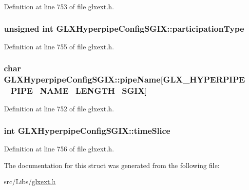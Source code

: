 Definition at line 753 of file glxext.h.

\hypertarget{struct_g_l_x_hyperpipe_config_s_g_i_x_a093cfaaec305531f66e1120929b5b01b}{
\subsubsection[{participationType}]{\setlength{\rightskip}{0pt plus 5cm}unsigned int {\bf GLXHyperpipeConfigSGIX::participationType}}}
\label{struct_g_l_x_hyperpipe_config_s_g_i_x_a093cfaaec305531f66e1120929b5b01b}


Definition at line 755 of file glxext.h.

\hypertarget{struct_g_l_x_hyperpipe_config_s_g_i_x_a9e3748f92005cac81cb44d4c67acccb8}{
\subsubsection[{pipeName}]{\setlength{\rightskip}{0pt plus 5cm}char {\bf GLXHyperpipeConfigSGIX::pipeName}\mbox{[}GLX\_\-HYPERPIPE\_\-PIPE\_\-NAME\_\-LENGTH\_\-SGIX\mbox{]}}}
\label{struct_g_l_x_hyperpipe_config_s_g_i_x_a9e3748f92005cac81cb44d4c67acccb8}


Definition at line 752 of file glxext.h.

\hypertarget{struct_g_l_x_hyperpipe_config_s_g_i_x_afe9288e75dc1ae5e0f33eff978d7024d}{
\subsubsection[{timeSlice}]{\setlength{\rightskip}{0pt plus 5cm}int {\bf GLXHyperpipeConfigSGIX::timeSlice}}}
\label{struct_g_l_x_hyperpipe_config_s_g_i_x_afe9288e75dc1ae5e0f33eff978d7024d}


Definition at line 756 of file glxext.h.



The documentation for this struct was generated from the following file:\begin{DoxyCompactItemize}
\item 
src/Libs/\hyperlink{glxext_8h}{glxext.h}\end{DoxyCompactItemize}

